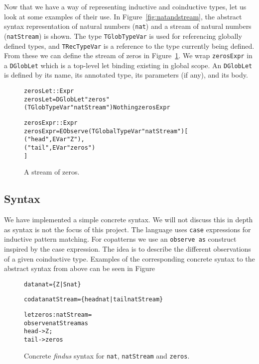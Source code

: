 Now that we have a way of representing inductive and coinductive types, let us look at some examples of their use. In Figure~\ref{fig:natandstream}, the abstract syntax representation of natural numbers (\texttt{nat}) and a stream of natural numbers (\texttt{natStream}) is shown. The type \texttt{TGlobTypeVar} is used for referencing globally defined types, and \texttt{TRecTypeVar} is a reference to the type currently being defined. From these we can define the stream of zeros in Figure~\ref{fig:astzeros}. We wrap \texttt{zerosExpr} in a \texttt{DGlobLet} which is a top-level let binding existing in global scope. An \texttt{DGlobLet} is defined by its name, its annotated type, its parameters (if any), and its body.

\begin{figure}
\begin{alltt}
zerosLet :: Expr
zerosLet = DGlobLet "zeros" (TGlobTypeVar "natStream") Nothing zerosExpr

zerosExpr :: Expr
zerosExpr = EObserve (TGlobalTypeVar "natStream") [
            ("head", EVar "Z"),
            ("tail", EVar "zeros")
        ]
\end{alltt}
\caption{A stream of zeros.}
\label{fig:astzeros}
\end{figure}

\subsection{Syntax}
We have implemented a simple concrete syntax. We will not discuss this in depth as syntax is not the focus of this project. The language uses \texttt{case} expressions for inductive pattern matching. For copatterns we use an \texttt{observe as} construct inspired by the case expression. The idea is to describe the different observations of a given coinductive type. Examples of the corresponding concrete syntax to the abstract syntax from above can be seen in Figure 

\begin{figure}
\begin{alltt}
data nat = \{Z | S nat\}

codata natStream = \{head nat | tail natStream\}

let zeros : natStream =
  observe natStream as
    head -> Z ;
    tail -> zeros
\end{alltt}
\caption{Concrete \textit{findus} syntax for \texttt{nat}, \texttt{natStream} and \texttt{zeros}.}
\end{figure}


